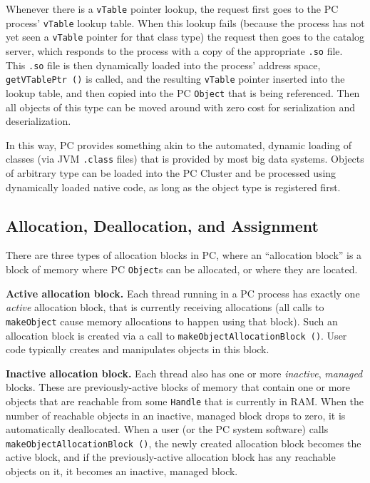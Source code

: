 Whenever there is a \texttt{vTable} pointer lookup, the request first goes to the PC process' \texttt{vTable} lookup table.  When this 
lookup fails (because the process has not yet seen a \texttt{vTable} pointer for that class
type) the request then goes to the catalog server, which responds to the process with a copy of the appropriate \texttt{.so} file.  This 
\texttt{.so} file is then 
dynamically loaded into the process' address space, \texttt{getVTablePtr ()} is called, 
and the resulting \texttt{vTable} pointer inserted into the lookup
table, and then copied into the PC \texttt{Object} that is being
referenced. Then all objects of this type can be moved around with
zero cost for serialization and deserialization. 

In this way, PC provides something akin to the automated,
dynamic loading of classes (via JVM \texttt{.class} files) that is
provided by most big data systems.  
Objects of arbitrary type can be loaded into the PC Cluster and be
processed using dynamically loaded native code, as long
as the object type is registered first.

\subsection{Allocation, Deallocation, and Assignment}

There are three types of allocation blocks in PC, where an ``allocation block'' is a block of memory where PC \texttt{Object}s can be
allocated, or where they are located.

\vspace{5pt}
\noindent
\textbf{Active allocation block.} Each thread running in a PC process has exactly one \emph{active} allocation block, that is currently receiving allocations (all calls to
\texttt{makeObject} cause memory allocations to happen using that block).  Such an allocation block is created via a call to 
\texttt{makeObjectAllocationBlock ()}.  User code typically creates and manipulates objects in this block.

\vspace{5pt}
\noindent
\textbf{Inactive allocation block.} Each thread also has one or more
\emph{inactive}, \emph{managed} blocks.  These are previously-active blocks of memory that contain one or more objects that are reachable
from some \texttt{Handle} that is currently in RAM.  When the number of reachable objects in an inactive, managed block drops to zero, it is automatically
deallocated.
When a user (or the PC system software) calls 
\texttt{makeObjectAllocationBlock ()}, the newly created allocation block becomes the active block, and if the previously-active allocation block has any
reachable objects on it, it becomes an inactive, managed block.

